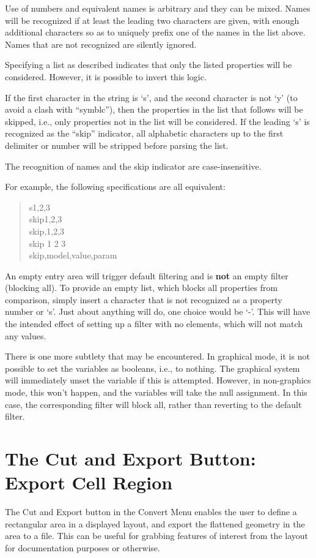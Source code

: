 Use of numbers and equivalent names is arbitrary and they can be
mixed.  Names will be recognized if at least the leading two
characters are given, with enough additional characters so as to
uniquely prefix one of the names in the list above.  Names that are
not recognized are silently ignored.

Specifying a list as described indicates that only the listed
properties will be considered.  However, it is possible to invert this
logic.

If the first character in the string is `{\vt s}', and the second
character is not `{\vt y}' (to avoid a clash with ``{\vt symblc}''),
then the properties in the list that follows will be skipped, i.e.,
only properties not in the list will be considered.  If the leading
`{\vt s}' is recognized as the ``skip'' indicator, all alphabetic
characters up to the first delimiter or number will be stripped before
parsing the list.

The recognition of names and the skip indicator are case-insensitive.

For example, the following specifications are all equivalent:
\begin{quote}
{\vt s1,2,3}\\
{\vt skip1,2,3}\\
{\vt skip,1,2,3}\\
{\vt skip 1 2 3}\\
{\vt skip,model,value,param}
\end{quote}

An empty entry area will trigger default filtering and is {\bf not} an
empty filter (blocking all).  To provide an empty list, which blocks
all properties from comparison, simply insert a character that is not
recognized as a property number or `{\vt s}'.  Just about anything
will do, one choice would be `{\vt -}'.  This will have the intended
effect of setting up a filter with no elements, which will not match
any values.

There is one more subtlety that may be encountered.  In graphical
mode, it is not possible to set the variables as booleans, i.e., to
nothing.  The graphical system will immediately unset the variable if
this is attempted.  However, in non-graphics mode, this won't happen, and
the variables will take the null assignment.  In this case, the
corresponding filter will block all, rather than reverting to the
default filter.


\section{The {\cb Cut and Export} Button: Export Cell Region}
The {\cb Cut and Export} button in the {\cb Convert Menu} enables the
user to define a rectangular area in a displayed layout, and export
the flattened geometry in the area to a file.  This can be useful for
grabbing features of interest from the layout for documentation
purposes or otherwise.

